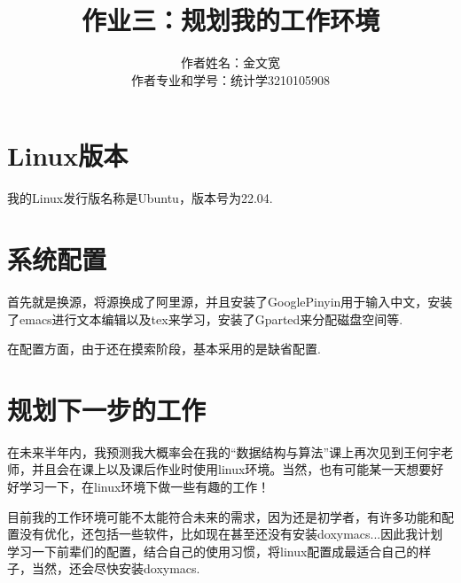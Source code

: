 \documentclass{ctexart}
\title{作业三：规划我的工作环境}
\author{作者姓名：金文宽 \\作者专业和学号：统计学3210105908}
\begin{document}
\section{Linux版本}
我的Linux发行版名称是Ubuntu，版本号为22.04.

\section{系统配置}
首先就是换源，将源换成了阿里源，并且安装了GooglePinyin用于输入中文，安装了emacs进行文本编辑以及tex来学习\LATEX，安装了Gparted来分配磁盘空间等.

在配置方面，由于还在摸索阶段，基本采用的是缺省配置.

\section{规划下一步的工作}
在未来半年内，我预测我大概率会在我的“数据结构与算法”课上再次见到王何宇老师，并且会在课上以及课后作业时使用linux环境。当然，也有可能某一天想要好好学习一下，在linux环境下做一些有趣的工作！

目前我的工作环境可能不太能符合未来的需求，因为还是初学者，有许多功能和配置没有优化，还包括一些软件，比如现在甚至还没有安装doxymacs...因此我计划学习一下前辈们的配置，结合自己的使用习惯，将linux配置成最适合自己的样子，当然，还会尽快安装doxymacs.
\end{document}
